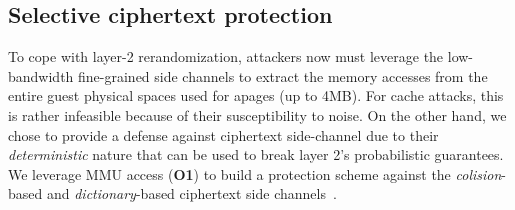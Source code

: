 \subsection{Selective ciphertext protection}
To cope with layer-2 rerandomization, attackers now must leverage the low-bandwidth fine-grained side channels to extract the memory accesses from the entire guest physical spaces used for \glspl{apage} (up to 4MB).
For cache attacks, this is rather infeasible because of their susceptibility to noise.
On the other hand, we chose to provide a defense against ciphertext side-channel due to their \emph{deterministic} nature that can be used to break layer 2's probabilistic guarantees.
We leverage MMU access (\textbf{O1}) to build a protection scheme against the \emph{colision}-based and \emph{dictionary}-based ciphertext side channels~\cite{cipherh,li2022systematic}.





